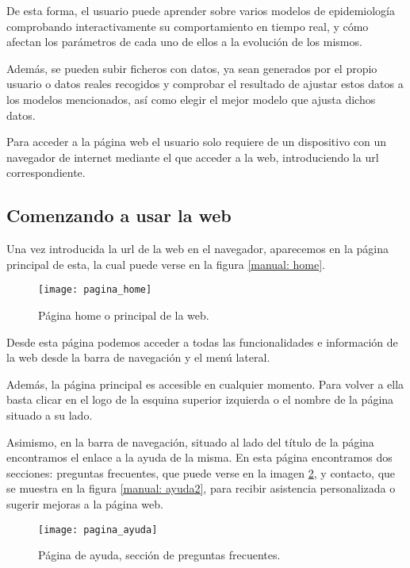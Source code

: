 De esta forma, el usuario puede aprender sobre varios modelos de epidemiología comprobando interactivamente su comportamiento en tiempo real, y cómo afectan los parámetros de cada uno de ellos a la evolución de los mismos.

Además, se pueden subir ficheros con datos, ya sean generados por el propio usuario o datos reales recogidos y comprobar el resultado de ajustar estos datos a los modelos mencionados, así como elegir el mejor modelo que ajusta dichos datos.

Para acceder a la página web el usuario solo requiere de un dispositivo con un navegador de internet mediante el que acceder a la web, introduciendo la url correspondiente.

\subsection{Comenzando a usar la web}

Una vez introducida la url de la web en el navegador, aparecemos en la página principal de esta, la cual puede verse en la figura \eqref{manual: home}.

\begin{figure}
\begin{center}
\caption{Página home o principal de la web.}
\label{manual: home}
\texttt{[image: pagina\_home]}
\end{center}
\end{figure}

Desde esta página podemos acceder a todas las funcionalidades e información de la web desde la barra de navegación y el menú lateral.

Además, la página principal es accesible en cualquier momento. Para volver a ella basta clicar en el logo de la esquina superior izquierda o el nombre de la página situado a su lado.

Asimismo, en la barra de navegación, situado al lado del título de la página encontramos el enlace a la ayuda de la misma. En esta página encontramos dos secciones: preguntas frecuentes, que puede verse en la imagen \ref{manual: ayuda1}, y contacto, que se muestra en la figura \ref{manual: ayuda2}, para recibir asistencia personalizada o sugerir mejoras a la página web.

\begin{figure}
\begin{center}
\caption{Página de ayuda, sección de preguntas frecuentes.}
\label{manual: ayuda1}
\texttt{[image: pagina\_ayuda]}
\end{center}
\end{figure}

